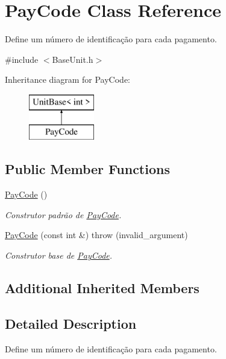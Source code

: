 \hypertarget{classPayCode}{\section{Pay\-Code Class Reference}
\label{d0/d34/classPayCode}
}


Define um número de identificação para cada pagamento.  




{\ttfamily \#include $<$Base\-Unit.\-h$>$}

Inheritance diagram for Pay\-Code\-:\begin{figure}[H]
\begin{center}
\leavevmode
\includegraphics[height=2.000000cm]{d0/d34/classPayCode}
\end{center}
\end{figure}
\subsection*{Public Member Functions}
\begin{DoxyCompactItemize}
\item 
\hyperlink{classPayCode_ac222821eaa2b803127fad4dd1d4b4bf3}{Pay\-Code} ()
\begin{DoxyCompactList}\small\item\em Construtor padrão de \hyperlink{classPayCode}{Pay\-Code}. \end{DoxyCompactList}\item 
\hyperlink{classPayCode_a919ab6e420b9bd55e8c470ea411aa97e}{Pay\-Code} (const int \&)  throw (invalid\-\_\-argument)
\begin{DoxyCompactList}\small\item\em Construtor base de \hyperlink{classPayCode}{Pay\-Code}. \end{DoxyCompactList}\end{DoxyCompactItemize}
\subsection*{Additional Inherited Members}


\subsection{Detailed Description}
Define um número de identificação para cada pagamento. 

